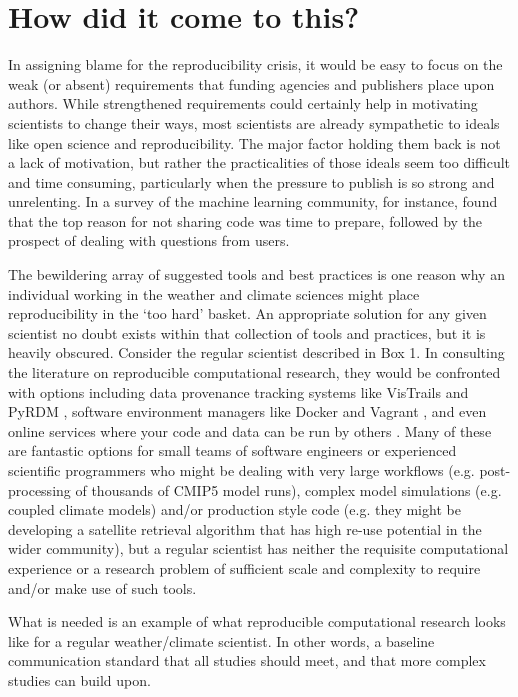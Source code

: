 \section{How did it come to this?}

In assigning blame for the reproducibility crisis, it would be easy to focus on the weak (or absent) requirements that funding agencies and publishers place upon authors. While strengthened requirements could certainly help in motivating scientists to change their ways, most scientists are already sympathetic to ideals like open science and reproducibility. The major factor holding them back is not a lack of motivation, but rather the practicalities of those ideals seem too difficult and time consuming, particularly when the pressure to publish is so strong and unrelenting. In a survey of the machine learning community, for instance, \citet{Stodden2010} found that the top reason for not sharing code was time to prepare, followed by the prospect of dealing with questions from users. 

The bewildering array of suggested tools and best practices is one reason why an individual working in the weather and climate sciences might place reproducibility in the `too hard' basket. An appropriate solution for any given scientist no doubt exists within that collection of tools and practices, but it is heavily obscured. Consider the regular scientist described in Box 1. In consulting the literature on reproducible computational research, they would be confronted with options including data provenance tracking systems like VisTrails \citep{Freire2012} and PyRDM \citep{Jacobs2014}, software environment managers like Docker and Vagrant \citep{Stodden2014}, and even online services where your code and data can be run by others \citep{Stodden2012}. Many of these are fantastic options for small teams of software engineers or experienced scientific programmers who might be dealing with very large workflows (e.g. post-processing of thousands of CMIP5 model runs), complex model simulations (e.g. coupled climate models) and/or production style code (e.g. they might be developing a satellite retrieval algorithm that has high re-use potential in the wider community), but a regular scientist has neither the requisite computational experience or a research problem of sufficient scale and complexity to require and/or make use of such tools.

What is needed is an example of what reproducible computational research looks like for a regular weather/climate scientist. In other words, a baseline communication standard that all studies should meet, and that more complex studies can build upon.